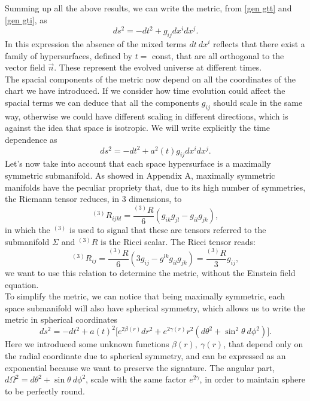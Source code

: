 Summing up all the above results, we can write the metric, from \eqref{gen gtt} and \eqref{gen gti}, as
\begin{equation*}
    ds^2=-dt^2+g_{ij}dx^i dx^j.
\end{equation*}
In this expression the absence of the mixed terms $dt\ dx^i$ reflects that there exist a family of hypersurfaces, defined by $t=$ const, that are all orthogonal to the vector field $\vec n$. These represent the evolved universe at different times.\\
The spacial components of the metric now depend on all the coordinates of the chart we have introduced. If we consider how time evolution could affect the spacial terms we can deduce that all the components $g_{ij}$ should scale in the same way, otherwise we could have different scaling in different directions, which is against the idea that space is isotropic. We will write explicitly the time dependence as
\begin{equation*}
    ds^2=-dt^2+a^2(t)g_{ij}dx^i dx^j.
\end{equation*} 
Let's now take into account that each space hypersurface is a maximally symmetric submanifold. 
As showed in Appendix A, maximally symmetric manifolds have the peculiar propriety that, due to its high number of symmetries, the Riemann tensor reduces, in 3 dimensions, to 
\begin{equation}
    ^{(3)}R_{ijkl}=\frac{^{(3)}R}{6}(g_{ik}g_{jl}-g_{il}g_{jk}),
\end{equation}
in which the $^{(3)}$ is used to signal that these are tensors referred to the submanifold $\Sigma$ and $^{(3)}R$ is the Ricci scalar. The Ricci tensor reads:
\begin{equation}\label{maxsymRicci}
    ^{(3)}R_{ij}=\frac{^{(3)}R}{6}(3g_{ij}-g^{lk}g_{il}g_{jk})=\frac{^{(3)}R}{3}g_{ij},
\end{equation}
we want to use this relation to determine the metric, without the Einstein field equation.\\
To simplify the metric, we can notice that being maximally symmetric, each space submanifold will also have spherical symmetry, which allows us to write the metric in spherical coordinates
\begin{equation}
    ds^2=-dt^2+a(t)^2\big[e^{2\beta(r)}dr^2+e^{2\gamma(r)}r^2(d\theta^2+\sin^2\theta\ d\phi^2)\big].
\end{equation}  
Here we introduced some unknown functions $\beta(r),\ \gamma(r)$, that depend only on the radial coordinate due to spherical symmetry, and can be expressed as an exponential because we want to preserve the signature. The angular part, $d\Omega^2= d\theta^2+\sin\theta\ d\phi^2$, scale with the same factor $e^{2\gamma}$, in order to maintain sphere to be perfectly round.\\
